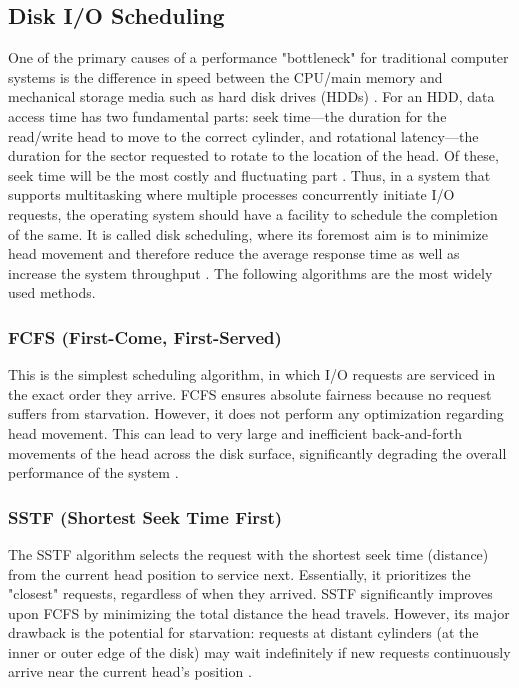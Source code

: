 \documentclass[12pt]{article}
\begin{document}
\subsection{Disk I/O Scheduling}

One of the primary causes of a performance "bottleneck" for traditional computer systems is the difference in speed between the CPU/main memory and mechanical storage media such as hard disk drives (HDDs) \parencite{Pokharel2021}. For an HDD, data access time has two fundamental parts: seek time—the duration for the read/write head to move to the correct cylinder, and rotational latency—the duration for the sector requested to rotate to the location of the head. Of these, seek time will be the most costly and fluctuating part \parencite{KansalDiskScheduling}. Thus, in a system that supports multitasking where multiple processes concurrently initiate I/O requests, the operating system should have a facility to schedule the completion of the same. It is called disk scheduling, where its foremost aim is to minimize head movement and therefore reduce the average response time as well as increase the system throughput \parencite{GeeksForGeeks2025IO}. The following algorithms are the most widely used methods.

\subsubsection{FCFS (First-Come, First-Served)}
This is the simplest scheduling algorithm, in which I/O requests are serviced in the exact order they arrive. FCFS ensures absolute fairness because no request suffers from starvation. However, it does not perform any optimization regarding head movement. This can lead to very large and inefficient back-and-forth movements of the head across the disk surface, significantly degrading the overall performance of the system \parencite{GeeksForGeeks2025IO}.

\subsubsection{SSTF (Shortest Seek Time First)}
The SSTF algorithm selects the request with the shortest seek time (distance) from the current head position to service next. Essentially, it prioritizes the "closest" requests, regardless of when they arrived. SSTF significantly improves upon FCFS by minimizing the total distance the head travels. However, its major drawback is the potential for starvation: requests at distant cylinders (at the inner or outer edge of the disk) may wait indefinitely if new requests continuously arrive near the current head's position \parencite{GeeksForGeeks2025IO} \parencite{KansalDiskScheduling}.
\end{document}
